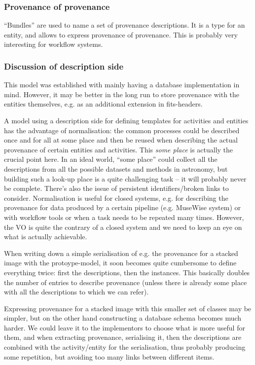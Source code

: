 \subsubsection{Provenance of provenance}
``Bundles'' are used to name a set of provenance descriptions. It is a type for 
an entity, and allows to express provenance of provenance. This is probably  
very interesting for workflow systems.

\subsubsection{Discussion of description side}
This model was established with mainly having a database implementation in mind. 
However, it may be better in the long run to store provenance with 
the entities themselves, e.g. as an additional extension in fits-headers.

A model using a description side for defining templates for activities and
entities has the advantage of normalisation: the common processes could be 
described once and for all at some place and then be reused when describing 
the actual provenance of certain entities and activities. This \emph{some place} 
is actually the crucial point here.
In an ideal world, ``some place'' could collect all the descriptions from all 
the possible datasets and methods in astronomy, but building such a look-up place 
is a quite challenging task -- it will probably never be complete. There's also 
the issue of persistent identifiers/broken links to consider.
Normalisation is useful for closed systems, e.g. for describing the provenance 
for data produced by a certain pipeline (e.g. MuseWise system) or with 
workflow tools or when a task needs to be repeated many times. However, the VO 
is quite the contrary of a closed system and we need to keep an eye on what is 
actually achievable.

When writing down a simple serialisation of e.g. the provenance for a stacked 
image with the protoype-model, it soon becomes quite cumbersome to define 
everything twice: first the descriptions, then the instances. This basically 
doubles the number of entries to describe provenance (unless there is already 
some place with all the descriptions to which we can refer).

Expressing provenance for a stacked image with this smaller set of classes may 
be simpler, but on the other hand constructing a database schema becomes much 
harder. 
We could leave it to the implementors to choose what is more useful for them, 
and when extracting provenance, serialising it, then the descriptions are 
combined with the activity/entity for 
the serialisation, thus probably producing some repetition, but avoiding too 
many links between different items.




